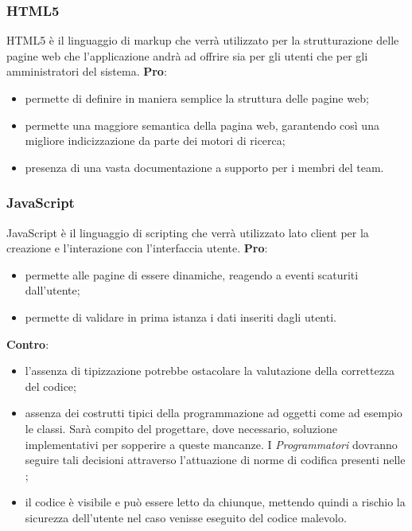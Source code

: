 
		\subsubsection{HTML5} %
		\label{ssub:html}
		HTML5 è il linguaggio di markup che verrà utilizzato per la strutturazione delle pagine web che l'applicazione andrà ad offrire sia per gli utenti che per gli amministratori del sistema. \newline
		\textbf{Pro}:
			\begin{itemize}
				\item permette di definire in maniera semplice la struttura delle pagine web;
				\item permette una maggiore semantica della pagina web, garantendo così una migliore indicizzazione da parte dei motori di ricerca;
				\item presenza di una vasta documentazione a supporto per i membri del team.
			\end{itemize}
			\noindent

		\subsubsection{JavaScript} %
		\label{ssub:javascript}
		JavaScript è il linguaggio di scripting che verrà utilizzato lato client per la creazione e l'interazione con l'interfaccia utente. \newline
		\textbf{Pro}:
			\begin{itemize}
				\item permette alle pagine di essere dinamiche, reagendo a eventi scaturiti dall'utente;
				\item permette di validare in prima istanza i dati inseriti dagli utenti.
			\end{itemize}
		\noindent
		\textbf{Contro}:
			\begin{itemize}
				\item l'assenza di tipizzazione potrebbe ostacolare la valutazione della correttezza del codice;
				\item assenza dei costrutti tipici della programmazione ad oggetti come ad esempio le classi. Sarà compito del \roleDesigner{} progettare, dove necessario, soluzione implementativi per sopperire a queste mancanze. I \emph{Programmatori} dovranno seguire tali decisioni attraverso l'attuazione di norme di codifica presenti nelle \docNameVersionNdP;
				\item il codice è visibile e può essere letto da chiunque, mettendo quindi a rischio la sicurezza dell'utente nel caso venisse eseguito del codice malevolo.
			\end{itemize}
			\noindent

